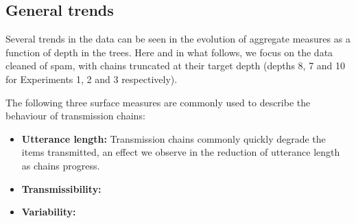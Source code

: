 \documentclass[a4paper,fleqn]{cas-dc}
\begin{document}




\subsection{General trends}\label{sec:gistr-results-general}

Several trends in the data can be seen in the evolution of aggregate measures as a function of depth in the trees. Here and in what follows, we focus on the data cleaned of spam, with chains truncated at their target depth (depths 8, 7 and 10 for Experiments 1, 2 and 3 respectively).

The following three surface measures are commonly used to describe the behaviour of transmission chains:

\begin{itemize}
	\item \textbf{Utterance length:}
	Transmission chains commonly quickly degrade the items transmitted, an effect we observe in the reduction of utterance length as chains progress.

	\item \textbf{Transmissibility:}


	\item \textbf{Variability:}


\end{itemize}
\end{document}
